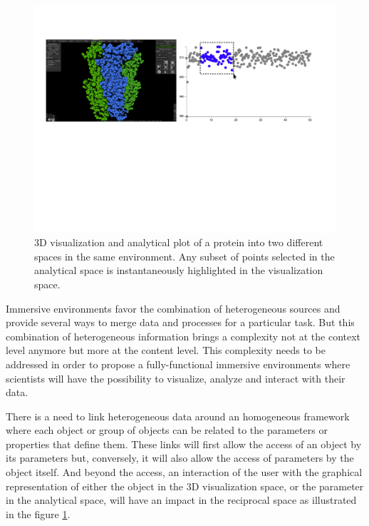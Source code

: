 \documentclass{vgtc}                          %
\begin{document}
\begin{figure}[htb]
  \centering
  \includegraphics[width=\linewidth, frame]{figures/interactive_selection.pdf}
  \caption{3D visualization and analytical plot of a protein into two different spaces in the same environment. Any subset of points selected in the analytical space is instantaneously highlighted in the visualization space.}
  \label{interactive_selection}
\end{figure}

Immersive environments favor the combination of heterogeneous sources and provide several ways to merge data and processes for a particular task. But this combination of heterogeneous information brings a complexity not at the context level anymore but more at the content level. This complexity needs to be addressed in order to propose a fully-functional immersive environments where scientists will have the possibility to visualize, analyze and interact with their data.

There is a need to link heterogeneous data around an homogeneous framework where each object or group of objects can be related to the parameters or properties that define them. These links will first allow the access of an object by its parameters but, conversely, it will also allow the access of parameters by the object itself. And beyond the access, an interaction of the user with the graphical representation of either the object in the 3D visualization space, or the parameter in the analytical space, will have an impact in the reciprocal space as illustrated in the figure \ref{interactive_selection}.
\end{document}
